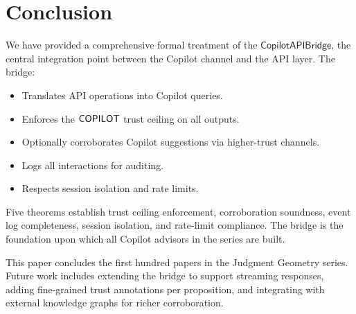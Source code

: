 \documentclass[11pt]{article}
\newcommand{\Bridge}{\mathsf{CopilotAPIBridge}}
\begin{document}
\section{Conclusion}\label{sec:conclusion}

We have provided a comprehensive formal treatment of the
$\Bridge$, the central integration point between the
Copilot channel and the \JuGeo{} API layer.  The bridge:
\begin{itemize}
\item Translates API operations into Copilot queries.
\item Enforces the $\mathsf{COPILOT}$ trust ceiling on all outputs.
\item Optionally corroborates Copilot suggestions via
      higher-trust channels.
\item Logs all interactions for auditing.
\item Respects session isolation and rate limits.
\end{itemize}
Five theorems establish trust ceiling enforcement,
corroboration soundness, event log completeness, session
isolation, and rate-limit compliance.  The bridge is the
foundation upon which all Copilot advisors in the \JuGeo{}
series are built.

This paper concludes the first hundred papers in the
Judgment Geometry series.  Future work includes extending
the bridge to support streaming responses, adding
fine-grained trust annotations per proposition, and
integrating with external knowledge graphs for richer
corroboration.
\end{document}
